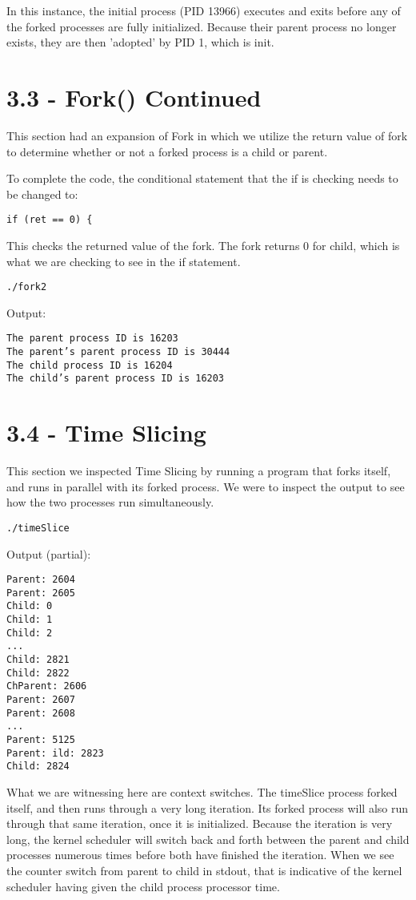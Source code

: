 \documentclass[11pt]{report}
\begin{document}
In this instance, the initial process (PID 13966) executes and exits before any of the forked processes are fully initialized. Because their parent process no longer exists, they are then 'adopted' by PID 1, which is init.


\section*{3.3 - Fork() Continued}
This section had an expansion of Fork in which we utilize the return value of fork to determine whether or not a forked process is a child or parent.

To complete the code, the conditional statement that the if is checking needs to be changed to:
\begin{verbatim}
if (ret == 0) {
\end{verbatim}

This checks the returned value of the fork. The fork returns 0 for child, which is what we are checking to see in the if statement.

\begin{verbatim}
./fork2
\end{verbatim}

Output:
\begin{verbatim}
The parent process ID is 16203
The parent’s parent process ID is 30444
The child process ID is 16204
The child’s parent process ID is 16203
\end{verbatim}

\newpage
\section*{3.4 - Time Slicing}
This section we inspected Time Slicing by running a program that forks itself, and runs in parallel with its forked process. We were to inspect the output to see how the two processes run simultaneously.

\begin{verbatim}
./timeSlice
\end{verbatim}

Output (partial):

\begin{verbatim}
Parent: 2604
Parent: 2605
Child: 0
Child: 1
Child: 2
...
Child: 2821
Child: 2822
ChParent: 2606
Parent: 2607
Parent: 2608
...
Parent: 5125
Parent: ild: 2823
Child: 2824
\end{verbatim}

What we are witnessing here are context switches. The timeSlice process forked itself, and then runs through a very long iteration. Its forked process will also run through that same iteration, once it is initialized. Because the iteration is very long, the kernel scheduler will switch back and forth between the parent and child processes numerous times before both have finished the iteration. When we see the counter switch from parent to child in stdout, that is indicative of the kernel scheduler having given the child process processor time.
\end{document}
